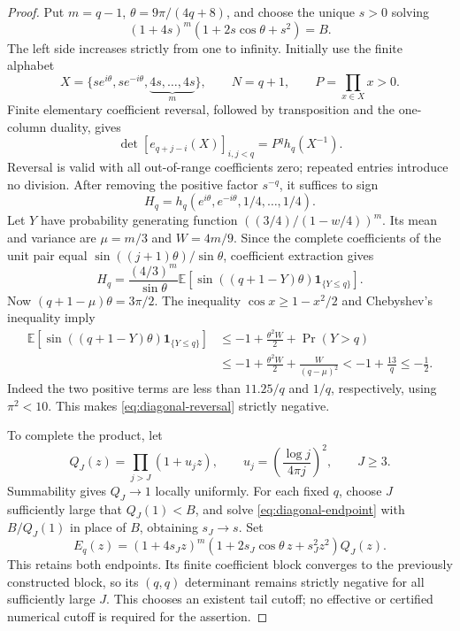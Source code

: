 \begin{proof}
Put $m=q-1$, $\theta=9\pi/(4q+8)$, and choose the unique $s>0$ solving
\begin{equation}
 (1+4s)^m(1+2s\cos\theta+s^2)=B.
 \label{eq:diagonal-endpoint}
\end{equation}
The left side increases strictly from one to infinity. Initially use
the finite alphabet
\[
 X=\{se^{i\theta},se^{-i\theta},\underbrace{4s,\ldots,4s}_{m}\},
 \qquad N=q+1,
 \qquad P=\prod_{x\in X}x>0.
\]
Finite elementary coefficient reversal, followed by transposition
and the one-column duality, gives
\begin{equation}
 \det[e_{q+j-i}(X)]_{i,j<q}=P^q h_q(X^{-1}).
 \label{eq:diagonal-reversal}
\end{equation}
Reversal is valid with all out-of-range coefficients zero; repeated
entries introduce no division. After removing the positive factor
$s^{-q}$, it suffices to sign
\[
 H_q=h_q(e^{i\theta},e^{-i\theta},1/4,\ldots,1/4).
\]
Let $Y$ have probability generating function
$((3/4)/(1-w/4))^m$. Its mean and variance are
$\mu=m/3$ and $W=4m/9$. Since the complete coefficients of the unit
pair equal $\sin((j+1)\theta)/\sin\theta$, coefficient extraction gives
\[
 H_q=\frac{(4/3)^m}{\sin\theta}
 \mathbb E\!\left[\sin((q+1-Y)\theta)\mathbf1_{\{Y\le q\}}\right].
\]
Now $(q+1-\mu)\theta=3\pi/2$. The inequality
$\cos x\ge1-x^2/2$ and Chebyshev's inequality imply
\begin{align*}
 \mathbb E[\sin((q+1-Y)\theta)\mathbf1_{\{Y\le q\}}]
 &\le-1+\frac{\theta^2W}{2}+\Pr(Y>q)\\
 &\le-1+\frac{\theta^2W}{2}+\frac{W}{(q-\mu)^2}
 <-1+\frac{13}{q}\le-\frac12.
\end{align*}
Indeed the two positive terms are less than $11.25/q$ and $1/q$,
respectively, using $\pi^2<10$. This makes
\eqref{eq:diagonal-reversal} strictly negative.

To complete the product, let
\[
 Q_J(z)=\prod_{j>J}(1+u_jz),\qquad
 u_j=\left(\frac{\log j}{4\pi j}\right)^2,\qquad J\ge3.
\]
Summability gives $Q_J\to1$ locally uniformly. For each fixed $q$,
choose $J$ sufficiently large that $Q_J(1)<B$, and solve
\eqref{eq:diagonal-endpoint} with $B/Q_J(1)$ in place of $B$, obtaining
$s_J\to s$. Set
\[
 E_q(z)=(1+4s_Jz)^m
 (1+2s_J\cos\theta\,z+s_J^2z^2)Q_J(z).
\]
This retains both endpoints. Its finite coefficient block converges
to the previously constructed block, so its $(q,q)$ determinant
remains strictly negative for all sufficiently large $J$.
This chooses an existent tail cutoff; no effective or certified
numerical cutoff is required for the assertion.


\end{proof}
